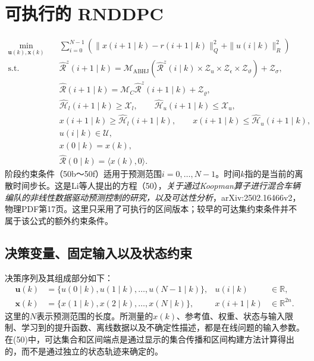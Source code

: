 \documentclass{article}
\begin{document}
\section*{可执行的 RNDDPC}
\begin{align}
\min_{\mathbf{u}(k),\mathbf{x}(k)}\quad &\sum_{i=0}^{N-1}\left(\|x(i+1\mid k)-r(i+1\mid k)\|_Q^2+\|u(i\mid k)\|_R^2\right) \tag{50a}\\
\text{s.t.}\quad
&\hat{\mathcal{R}}^z(i+1\mid k)=\mathcal{M}_{\mathrm{ABHJ}}\left(\hat{\mathcal{R}}^z(i\mid k)\times\mathcal{Z}_u\times\mathcal{Z}_{\epsilon}\times\mathcal{Z}_{\vartheta}\right)+\mathcal{Z}_{\sigma}, \tag{50b}\\
&\hat{\mathcal{R}}(i+1\mid k)=\mathcal{M}_C\hat{\mathcal{R}}^z(i+1\mid k)+\mathcal{Z}_{\varrho}, \tag{50c}\\
&\hat{\mathcal{H}}_l(i+1\mid k)\geq\mathcal{X}_l,\qquad \hat{\mathcal{H}}_u(i+1\mid k)\leq\mathcal{X}_u, \tag{50d}\\
&x(i+1\mid k)\geq\hat{\mathcal{H}}_l(i+1\mid k),\qquad x(i+1\mid k)\leq\hat{\mathcal{H}}_u(i+1\mid k), \tag{50e}\\
&u(i\mid k)\in\mathcal{U}, \tag{50f}\\
&x(0\mid k)=x(k), \tag{50g}\\
&\hat{\mathcal{R}}(0\mid k)=\langle x(k),0\rangle. \tag{50h}
\end{align}
阶段约束条件（50b～50f）适用于预测范围$i=0,\ldots,N-1$。时间$k$指的是当前的离散时间步长。这是Li等人提出的方程（50），\emph{关于通过Koopman算子进行混合车辆编队的非线性数据驱动预测控制的研究，以及可达性分析}，arXiv:2502.16466v2，物理PDF第17页。这里只采用了可执行的区间版本；较早的可达集约束条件并不属于该公式的额外约束条件。

\subsection*{决策变量、固定输入以及状态约束}
决策序列及其组成部分如下：
\[
\begin{aligned}
\mathbf{u}(k)&=\{u(0\mid k),u(1\mid k),\ldots,u(N-1\mid k)\}, &u(i\mid k)&\in\mathbb{R},\\
\mathbf{x}(k)&=\{x(1\mid k),x(2\mid k),\ldots,x(N\mid k)\}, &x(i+1\mid k)&\in\mathbb{R}^{2n}.
\end{aligned}
\]
这里的$N$表示预测范围的长度。所测量的$x(k)$、参考值、权重、状态与输入限制、学习到的提升函数、离线数据以及不确定性描述，都是在线问题的输入参数。在(50)中，可达集合和区间端点是通过显示的集合传播和区间构建方法计算得出的，而不是通过独立的状态轨迹来确定的。
\end{document}
